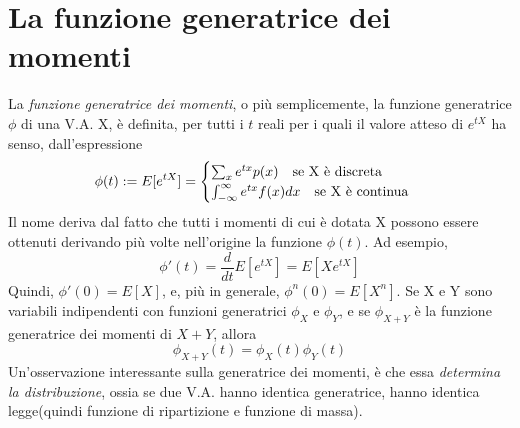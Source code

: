 \documentclass[11pt]{article}
\begin{document}
\section{La funzione generatrice dei momenti}
La \textit{funzione generatrice dei momenti}, o più semplicemente, la funzione generatrice $\phi$ di una V.A. X, è definita, per tutti i $t$ reali per i quali il valore atteso di $e^{tX}$ ha senso, dall'espressione
\begin{displaymath}
    \phi(t):=E[e^{tX}]=
    \begin{cases}
        \sum_x e^{tx}p(x)\hspace{10px}\mbox{se X è discreta}\\ 
        \int_{-\infty}^\infty e^{tx} f(x)dx\hspace{10px}\mbox{se X è continua}
    \end{cases}
\end{displaymath} 
Il nome deriva dal fatto che tutti i momenti di cui è dotata X possono essere ottenuti derivando più volte nell'origine la funzione $\phi(t)$. Ad esempio,
\begin{displaymath}
    \phi'(t)=\frac{d}{dt}E[e^{tX}]=E[Xe^{tX}]
\end{displaymath}
Quindi, $\phi'(0) = E[X]$, e, più in generale, $\phi^n(0) = E[X^n]$.
Se X e Y sono variabili indipendenti con funzioni generatrici $\phi_X$ e $\phi_Y$, e se $\phi_{X+Y}$ è la funzione generatrice dei momenti di $X+Y$, allora
\begin{displaymath}
    \phi_{X+Y}(t) = \phi_X(t)\phi_Y(t)
\end{displaymath}
Un'osservazione interessante sulla generatrice dei momenti, è che essa \textit{determina la distribuzione}, ossia se due V.A. hanno identica generatrice, hanno identica legge(quindi funzione di ripartizione e funzione di massa).
\end{document}
